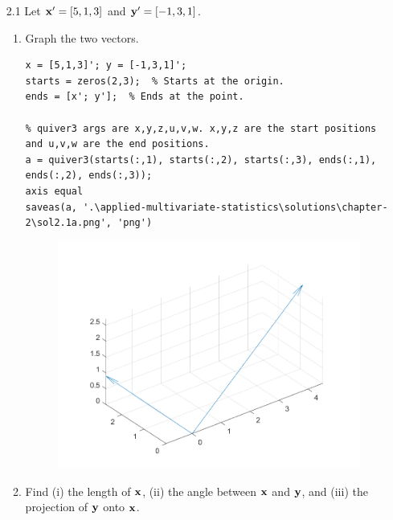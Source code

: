     \begin{enumerate}[font=\bfseries]
        \item[2.1]
        Let $\bold{x}^\prime = [5,1,3]$ and $\bold{y}^\prime = [-1,3,1]$.
        \begin{enumerate}
            \item Graph the two vectors.
            
            \begin{lstlisting}
x = [5,1,3]'; y = [-1,3,1]';
starts = zeros(2,3);  % Starts at the origin.
ends = [x'; y'];  % Ends at the point.

% quiver3 args are x,y,z,u,v,w. x,y,z are the start positions and u,v,w are the end positions.
a = quiver3(starts(:,1), starts(:,2), starts(:,3), ends(:,1), ends(:,2), ends(:,3));
axis equal
saveas(a, '.\applied-multivariate-statistics\solutions\chapter-2\sol2.1a.png', 'png')
            \end{lstlisting}

            \begin{figure}[H]
                \centering
                \includegraphics[scale=0.5]{./matlab/chapter-2/sol2.1a.png}
            \end{figure}
            

            \item Find (i) the length of $\bold{x}$, (ii) the angle between $\bold{x}$ and $\bold{y}$, and (iii) the projection of $\bold{y}$ onto $\bold{x}$.
            

\end{enumerate}
\end{enumerate}
